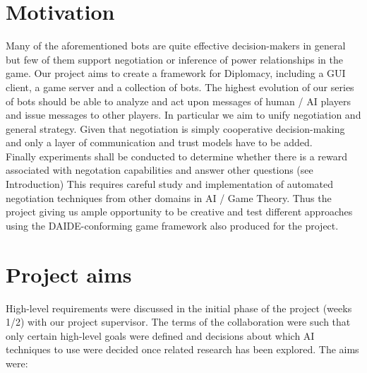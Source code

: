 \documentclass[pdftex,11pt,a4paper]{report}
\begin{document}

\pagebreak

\section{Motivation}

Many of the aforementioned bots are quite effective decision-makers in
general but few of them support negotiation or inference of power relationships
in the game. Our project aims to create a framework for
Diplomacy, including a GUI client, a game server and a collection of
bots. The highest evolution of our series of bots should be able to
analyze and act upon messages of human / AI players and issue messages
to other players. In particular we aim to unify negotiation and
general strategy. Given that negotiation is simply cooperative 
decision-making and only a layer of communication and trust models have
to be added. \\

Finally experiments shall be conducted to determine whether there is a
reward associated with negotation capabilities and answer other
questions (see Introduction) This requires careful study and implementation
of automated negotiation techniques from other domains in AI / Game Theory.
Thus the project giving us ample opportunity to be creative and test
different approaches using the DAIDE-conforming game framework also produced
for the project.

\section{Project aims}

High-level requirements were discussed in the initial phase of the
project (weeks 1/2) with our project supervisor. The terms of the
collaboration were such that only certain high-level goals were
defined and decisions about which AI techniques to use were decided once
related research has been explored. The aims were:
\end{document}
